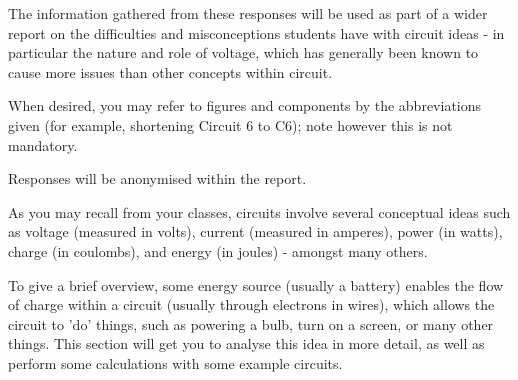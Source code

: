 \documentclass[a4paper,openany,nobib]{tufte-book}
\begin{document}
The information gathered from these responses will be used as part of a wider report on the difficulties and misconceptions students have with circuit ideas - in particular the nature and role of voltage, which has generally been known to cause more issues than other concepts within circuit.

When desired, you may refer to figures and components by the abbreviations given (for example, shortening Circuit 6 to C6); note however this is not mandatory.

Responses will be anonymised within the report.


As you may recall from your classes, circuits involve several conceptual ideas such as voltage (measured in volts), current (measured in amperes), power (in watts), charge (in coulombs), and energy (in joules) - amongst many others. 

To give a brief overview, some energy source (usually a battery) enables the flow of charge within a circuit (usually through electrons in wires), which allows the circuit to 'do' things, such as powering a bulb, turn on a screen, or many other things. This section will get you to analyse this idea in more detail, as well as perform some calculations with some example circuits.
\end{document}

